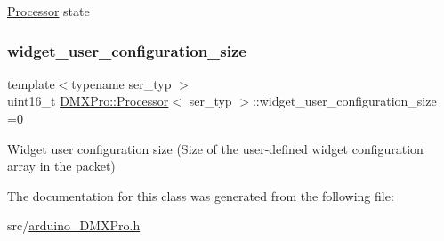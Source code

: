 \hyperlink{classDMXPro_1_1Processor}{Processor} state \mbox{\label{classDMXPro_1_1Processor_a45fb005d1d5aa98896a8a29362f5a7e8}} 
\subsubsection{\texorpdfstring{widget\+\_\+user\+\_\+configuration\+\_\+size}{widget\_user\_configuration\_size}}
{\footnotesize\ttfamily template$<$typename ser\+\_\+typ $>$ \\
uint16\+\_\+t \hyperlink{classDMXPro_1_1Processor}{D\+M\+X\+Pro\+::\+Processor}$<$ ser\+\_\+typ $>$\+::widget\+\_\+user\+\_\+configuration\+\_\+size =0\hspace{0.3cm}{\ttfamily [private]}}

Widget user configuration size (Size of the user-\/defined widget configuration array in the packet) 

The documentation for this class was generated from the following file\+:\begin{DoxyCompactItemize}
\item 
src/\hyperlink{arduino__DMXPro_8h}{arduino\+\_\+\+D\+M\+X\+Pro.\+h}\end{DoxyCompactItemize}

